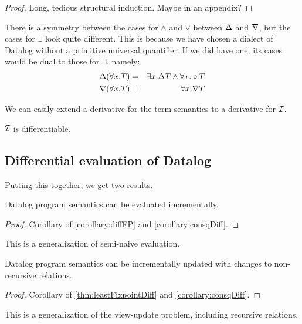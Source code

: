 \begin{proof}
  Long, tedious structural induction. Maybe in an appendix?
\end{proof}

There is a symmetry between the cases for $\wedge$ and $\vee$ between $\Delta$
and $\nabla$, but the cases for $\exists$ look quite different. 
This is because we have chosen a dialect of Datalog without a primitive universal quantifier.
If we did have one, its cases would be dual to those for $\exists$, namely:
\begin{eqnarray*}
\Delta(\forall x.T) & = & \exists x. \Delta T \wedge \forall x. \diamond T\\
\nabla(\forall x.T) & = & \forall x. \nabla T
\end{eqnarray*}

We can easily extend a derivative for the term semantics to a derivative for $\mathcal{I}$.

\begin{corollary}
\label{corollary:consqDiff}
  $\mathcal{I}$ is differentiable.
\end{corollary}

\subsection{Differential evaluation of Datalog}

Putting this together, we get two results.

\begin{thm}
\label{thm:diffEval}
  Datalog program semantics can be evaluated incrementally.
\end{thm}
\begin{proof}
  Corollary of \cref{corollary:diffFP} and \cref{corollary:consqDiff}.
\end{proof}

This is a generalization of semi-naive evaluation.

\begin{thm}
\label{thm:diffUpdate}
  Datalog program semantics can be incrementally updated with changes to non-recursive relations.
\end{thm}
\begin{proof}
  Corollary of \cref{thm:leastFixpointDiff} and \cref{corollary:consqDiff}.
\end{proof}

This is a generalization of the view-update problem, including recursive relations.


